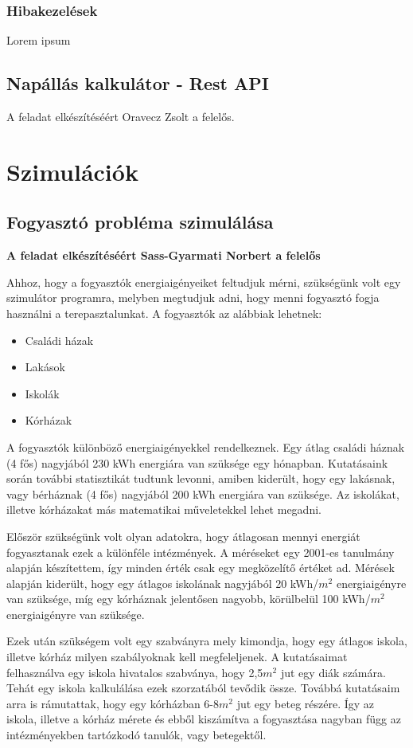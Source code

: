 \documentclass[
]{thesis-ekf}
\theoremstyle{definition}
\theoremstyle{remark}
\begin{document}
			\subsubsection{Hibakezelések}
				Lorem ipsum
		\subsection{Napállás kalkulátor - Rest API}
			A feladat elkészítéséért Oravecz Zsolt a felelős. 
	\section{Szimulációk}
		\subsection{Fogyasztó probléma szimulálása}
			\par \textbf{A feladat elkészítéséért Sass-Gyarmati Norbert a felelős}
			\par Ahhoz, hogy a fogyasztók energiaigényeiket feltudjuk mérni, szükségünk volt egy szimulátor programra, melyben megtudjuk adni, hogy menni fogyasztó fogja használni a terepasztalunkat. A fogyasztók az alábbiak lehetnek:
			\begin{itemize}
				\item Családi házak
				\item Lakások
				\item Iskolák
				\item Kórházak
			\end{itemize}
			\par A fogyasztók különböző energiaigényekkel rendelkeznek. Egy átlag családi háznak (4 fős) nagyjából 230 kWh energiára van szüksége egy hónapban. Kutatásaink során további statisztikát tudtunk levonni, amiben kiderült, hogy egy lakásnak, vagy bérháznak (4 fős) nagyjából 200 kWh energiára van szüksége\cite{kWh}. Az iskolákat, illetve kórházakat más matematikai műveletekkel lehet megadni. 
			\par Először szükségünk volt olyan adatokra, hogy átlagosan mennyi energiát fogyasztanak ezek a különféle intézmények. A méréseket egy 2001-es tanulmány alapján készítettem, így minden érték csak egy megközelítő értéket ad. Mérések alapján kiderült, hogy egy átlagos iskolának nagyjából 20 kWh/$m^{2}$ energiaigényre van szüksége, míg egy kórháznak jelentősen nagyobb, körülbelül 100 kWh/$m^{2}$ energiaigényre van szüksége\cite{school}. 
			\par Ezek után szükségem volt egy szabványra mely kimondja, hogy egy átlagos iskola, illetve kórház milyen szabályoknak kell megfeleljenek. A kutatásaimat felhasználva egy iskola hivatalos szabványa, hogy 2,5$m^{2}$ jut egy diák számára\cite{school_m2}. Tehát egy iskola kalkulálása ezek szorzatából tevődik össze. Továbbá kutatásaim arra is rámutattak, hogy egy kórházban 6-8$m^{2}$ jut egy beteg részére. Így az iskola, illetve a kórház mérete és ebből kiszámítva a fogyasztása nagyban függ az intézményekben tartózkodó tanulók, vagy betegektől.
\end{document}

